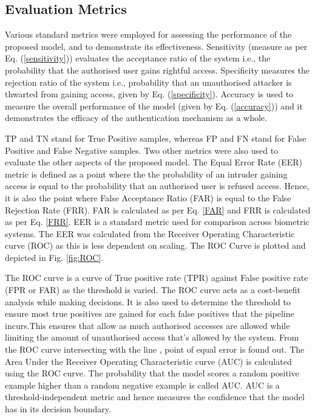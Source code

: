 \documentclass[letterpaper]{article}
\begin{document}
\subsection{Evaluation Metrics}
Various standard metrics were employed for assessing the performance of the proposed model, and to demonstrate its effectiveness. Sensitivity (measure as per Eq. (\ref{sensitivity})) evaluates the acceptance ratio of the system i.e., the probability that the authorised user gains rightful access. Specificity measures the rejection ratio of the system i.e., probability that an unauthorised attacker is thwarted from gaining access, given by Eq. (\ref{specificity}). Accuracy is used to measure the overall performance of the model (given by Eq. (\ref{accuracy})) and it demonstrates the efficacy of the authentication mechanism as a whole.





\vspace{0.5em}
TP and TN stand for True Positive samples, whereas FP and FN stand for False Positive and False Negative samples. Two other metrics were also used to evaluate the other aspects of the proposed model. The Equal Error Rate (EER) metric is defined as a point where the the probability of an intruder gaining access is equal to the probability that an authorised user is refused access. Hence, it is also the point where False Acceptance Ratio (FAR) is equal to the False Rejection Rate (FRR). FAR is calculated as per Eq. \ref{FAR} and FRR is calculated as per Eq. \ref{FRR}. EER is a standard metric used for comparison across biometric systems. The EER was calculated from the Receiver Operating Characteristic curve (ROC) as this is less dependent on scaling. The ROC Curve is plotted and depicted in Fig. \ref{fig:ROC}.



\vspace{0.5em}
The ROC curve is a curve of True positive rate (TPR) against False positive rate (FPR or FAR) as the threshold is varied. The ROC curve acts as a cost-benefit analysis while making decisions. It is also used to determine the threshold to ensure most true positives are gained for each false positives that the pipeline incurs.This ensures that allow as much authorised accesses are allowed while limiting the amount of unauthorised access that's allowed by the system. 
From the ROC curve intersecting with the line  , point of equal error is found out. The Area Under the Receiver Operating Characteristic curve (AUC) is calculated  using the ROC curve. The probability that the model scores a random positive example higher than a random negative example is called AUC. AUC is a threshold-independent metric and hence measures the confidence that the model has in its decision boundary.
\end{document}
